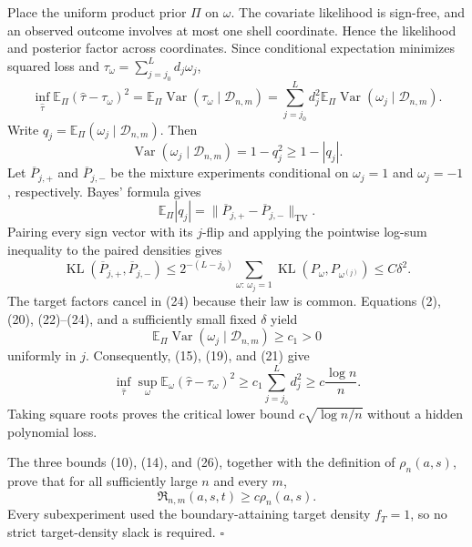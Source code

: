 Place the uniform product prior \(\Pi\) on \(\omega\). The covariate likelihood is sign-free, and an observed outcome involves at most one shell coordinate. Hence the likelihood and posterior factor across coordinates. Since conditional expectation minimizes squared loss and \(\tau_\omega=\sum_{j=j_0}^Ld_j\omega_j\),
\[
 \inf_{\widehat\tau}
 \mathbb E_\Pi(\widehat\tau-\tau_\omega)^2
 =
 \mathbb E_\Pi\operatorname{Var}
       (\tau_\omega\mid\mathcal D_{n,m})
 =\sum_{j=j_0}^Ld_j^2
   \mathbb E_\Pi\operatorname{Var}
       (\omega_j\mid\mathcal D_{n,m}).
\tag{21}
\]
Write \(q_j=\mathbb E_\Pi(\omega_j\mid\mathcal D_{n,m})\). Then
\[
 \operatorname{Var}(\omega_j\mid\mathcal D_{n,m})
 =1-q_j^2\ge1-|q_j|.
\tag{22}
\]
Let \(\overline P_{j,+}\) and \(\overline P_{j,-}\) be the mixture experiments conditional on \(\omega_j=1\) and \(\omega_j=-1\), respectively. Bayes' formula gives
\[
 \mathbb E_\Pi|q_j|
 =\lVert\overline P_{j,+}-\overline P_{j,-}\rVert_{\mathrm{TV}}.
\tag{23}
\]
Pairing every sign vector with its \(j\)-flip and applying the pointwise log-sum inequality to the paired densities gives
\[
 \operatorname{KL}(\overline P_{j,+},\overline P_{j,-})
 \le 2^{-(L-j_0)}
 \sum_{\omega:\,\omega_j=1}
 \operatorname{KL}(P_\omega,P_{\omega^{(j)}})
 \le C\delta^2.
\tag{24}
\]
The target factors cancel in (24) because their law is common. Equations (2), (20), (22)--(24), and a sufficiently small fixed \(\delta\) yield
\[
 \mathbb E_\Pi\operatorname{Var}
   (\omega_j\mid\mathcal D_{n,m})
 \ge c_1>0
\tag{25}
\]
uniformly in \(j\). Consequently, (15), (19), and (21) give
\[
 \inf_{\widehat\tau}\sup_\omega
 \mathbb E_\omega(\widehat\tau-\tau_\omega)^2
 \ge c_1\sum_{j=j_0}^Ld_j^2
 \ge c\frac{\log n}{n}.
\tag{26}
\]
Taking square roots proves the critical lower bound \(c\sqrt{\log n/n}\) without a hidden polynomial loss.

The three bounds (10), (14), and (26), together with the definition of \(\rho_n(a,s)\), prove that for all sufficiently large \(n\) and every \(m\),
\[
 \mathfrak R_{n,m}(a,s,t)
 \ge c\rho_n(a,s).
\]
Every subexperiment used the boundary-attaining target density \(f_T=1\), so no strict target-density slack is required. \(\square\)